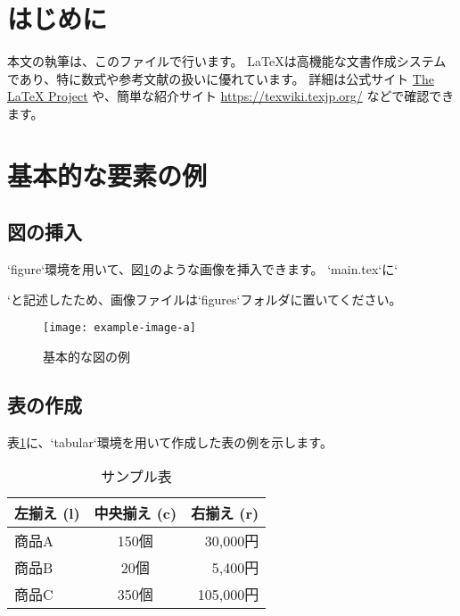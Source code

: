 
\section{はじめに}

本文の執筆は、このファイルで行います。
LaTeXは高機能な文書作成システムであり\cite{lamport1994}、特に数式や参考文献の扱いに優れています。
詳細は公式サイト \href{https://www.latex-project.org/}{The LaTeX Project} や、簡単な紹介サイト \url{https://texwiki.texjp.org/} などで確認できます。




\section{基本的な要素の例}

\subsection{図の挿入}
`figure`環境を用いて、図\ref{fig:sample}のような画像を挿入できます。
`main.tex`に`\graphicspath{{figures/}}`と記述したため、画像ファイルは`figures`フォルダに置いてください。

\begin{figure}[htbp]
  \centering
  \texttt{[image: example-image-a]}
  \caption{基本的な図の例}
  \label{fig:sample}
\end{figure}

\subsection{表の作成}
表\ref{tab:sample}に、`tabular`環境を用いて作成した表の例を示します。

\begin{table}[htbp]
  \centering
  \caption{サンプル表}
  \label{tab:sample}
  \begin{tabular}{|l|c|r|}
    \hline
    \textbf{左揃え (l)} & \textbf{中央揃え (c)} & \textbf{右揃え (r)} \\
    \hline
    商品A & 150個 & 30,000円 \\
    商品B & 20個 & 5,400円 \\
    商品C & 350個 & 105,000円 \\
    \hline
  \end{tabular}
\end{table}

